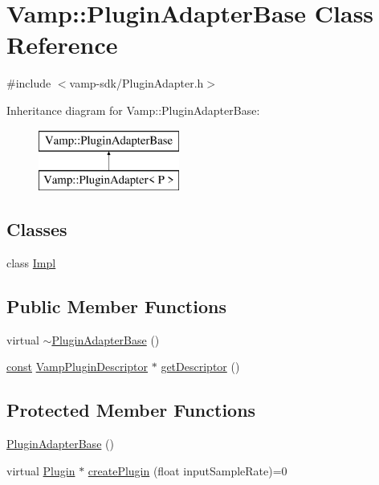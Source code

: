 \hypertarget{class_vamp_1_1_plugin_adapter_base}{}\section{Vamp\+:\+:Plugin\+Adapter\+Base Class Reference}
\label{class_vamp_1_1_plugin_adapter_base}


{\ttfamily \#include $<$vamp-\/sdk/\+Plugin\+Adapter.\+h$>$}

Inheritance diagram for Vamp\+:\+:Plugin\+Adapter\+Base\+:\begin{figure}[H]
\begin{center}
\leavevmode
\includegraphics[height=2.000000cm]{class_vamp_1_1_plugin_adapter_base}
\end{center}
\end{figure}
\subsection*{Classes}
\begin{DoxyCompactItemize}
\item 
class \hyperlink{class_vamp_1_1_plugin_adapter_base_1_1_impl}{Impl}
\end{DoxyCompactItemize}
\subsection*{Public Member Functions}
\begin{DoxyCompactItemize}
\item 
virtual \hyperlink{class_vamp_1_1_plugin_adapter_base_ae39492abdca4b588a582962fdeab819d}{$\sim$\+Plugin\+Adapter\+Base} ()
\item 
\hyperlink{getopt1_8c_a2c212835823e3c54a8ab6d95c652660e}{const} \hyperlink{vamp_8h_aa1d6e0792099b9516a89b5fb7ed2ad2b}{Vamp\+Plugin\+Descriptor} $\ast$ \hyperlink{class_vamp_1_1_plugin_adapter_base_a7ff5c9374a8dc43f977c3707d1da45b5}{get\+Descriptor} ()
\end{DoxyCompactItemize}
\subsection*{Protected Member Functions}
\begin{DoxyCompactItemize}
\item 
\hyperlink{class_vamp_1_1_plugin_adapter_base_a5dad6a9b4b170c0f284962e125ac988e}{Plugin\+Adapter\+Base} ()
\item 
virtual \hyperlink{class_vamp_1_1_plugin}{Plugin} $\ast$ \hyperlink{class_vamp_1_1_plugin_adapter_base_a9116adb9b7a426f4f0ded15e45a5531b}{create\+Plugin} (float input\+Sample\+Rate)=0
\end{DoxyCompactItemize}
